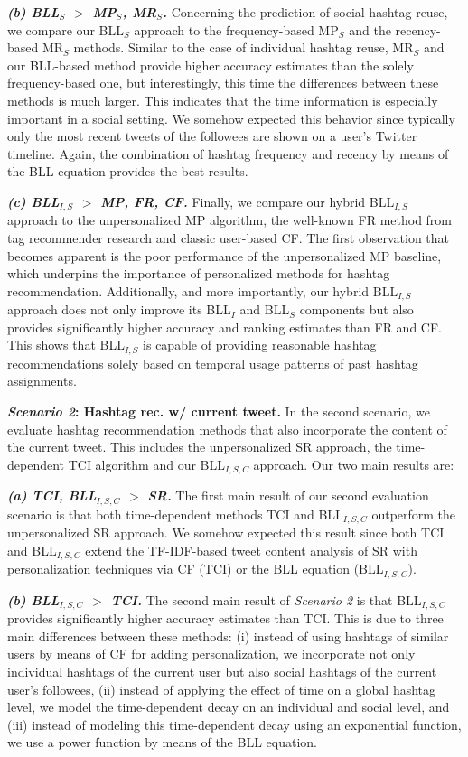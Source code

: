 \documentclass{sig-alternate-05-2015}
\newcommand{\para}[1]{\vspace{2mm}\noindent\textbf{#1}}
\newcommand{\subpara}[1]{\textit{\textbf{#1}}}
\begin{document}
\subpara{(b) BLL$_S$ $>$ MP$_S$, MR$_S$.} Concerning the prediction of social hashtag reuse, we compare our BLL$_S$ approach to the frequency-based MP$_S$ and the recency-based MR$_S$ methods. Similar to the case of individual hashtag reuse, MR$_S$ and our BLL-based method provide higher accuracy estimates than the solely frequency-based one, but interestingly, this time the differences between these methods is much larger. This indicates that the time information is especially important in a social setting. We somehow expected this behavior since typically only the most recent tweets of the followees are shown on a user's Twitter timeline. Again, the combination of hashtag frequency and recency by means of the BLL equation provides the best results.

\subpara{(c) BLL$_{I,S}${} $>$ MP, FR, CF.} Finally, we compare our hybrid BLL$_{I,S}${} approach to the unpersonalized MP algorithm, the well-known FR method from tag recommender research and classic user-based CF. The first observation that becomes apparent is the poor performance of the unpersonalized MP baseline, which underpins the importance of personalized methods for hashtag recommendation.
Additionally, and more importantly, our hybrid BLL$_{I,S}${} approach does not only improve its BLL$_I$ and BLL$_S$ components but also provides significantly higher accuracy and ranking estimates than FR and CF. This shows that BLL$_{I,S}${} is capable of providing reasonable hashtag recommendations solely based on temporal usage patterns of past hashtag assignments.

\para{\textit{Scenario 2}{}: Hashtag rec. w/ current tweet.} In the second scenario, we evaluate hashtag recommendation methods that also incorporate the content of the current tweet. This includes the unpersonalized SR approach, the time-dependent TCI algorithm and our BLL$_{I,S,C}${} approach. Our two main results are:

\subpara{(a) TCI, BLL$_{I,S,C}${} $>$ SR.} The first main result of our second evaluation scenario is that both time-dependent methods TCI and BLL$_{I,S,C}${} outperform the unpersonalized SR approach. We somehow expected this result since both TCI and BLL$_{I,S,C}${} extend the TF-IDF-based tweet content analysis of SR with personalization techniques via CF (TCI) or the BLL equation (BLL$_{I,S,C}${}).

\subpara{(b) BLL$_{I,S,C}${} $>$ TCI.} The second main result of \textit{Scenario 2}{} is that BLL$_{I,S,C}${} provides significantly higher accuracy estimates than TCI. This is due to three main differences between these methods: (i) instead of using hashtags of similar users by means of CF for adding personalization, we incorporate not only individual hashtags of the current user but also social hashtags of the current user's followees, (ii) instead of applying the effect of time on a global hashtag level, we model the time-dependent decay on an individual and social level, and (iii) instead of modeling this time-dependent decay using an exponential function, we use a power function by means of the BLL equation.
\end{document}
